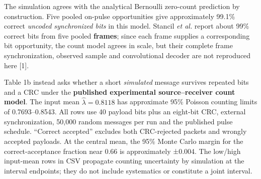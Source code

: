 \documentclass[
]{article}
\begin{document}
The simulation agrees with the analytical Bernoulli zero-count
prediction by construction. Five pooled on-pulse opportunities give
approximately 99.1\% correct \emph{uncoded synchronized bits} in this
model. Stancil \emph{et al.} report about 99\% correct bits from five
pooled \textbf{frames}; since each frame supplies a corresponding bit
opportunity, the count model agrees in scale, but their complete frame
synchronization, observed sample and convolutional decoder are not
reproduced here {[}1{]}.

Table 1b instead asks whether a short \emph{simulated} message survives
repeated bits and a CRC under the \textbf{published experimental
source--receiver count model}. The input mean
\({\hat{\lambda}} = 0.8118\) has approximate 95\% Poisson counting
limits of 0.7693--0.8543. All rows use 40 payload bits plus an eight-bit
CRC, external synchronization, 50,000 random messages per run and the
published pulse schedule. ``Correct accepted'' excludes both
CRC-rejected packets and wrongly accepted payloads. At the central mean,
the 95\% Monte Carlo margin for the correct-acceptance fraction near
0.66 is approximately ±0.004. The low/high input-mean rows in CSV
propagate counting uncertainty by simulation at the interval endpoints;
they do not include systematics or constitute a joint interval.
\end{document}
